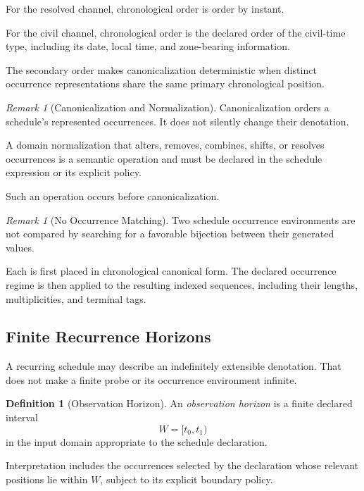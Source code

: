 \documentclass[11pt]{article}
\theoremstyle{plain}
\theoremstyle{definition}
\newtheorem{definition}[theorem]{Definition}
\theoremstyle{remark}
\newtheorem{remark}[theorem]{Remark}
\begin{document}
For the resolved channel,
chronological order is order by instant.

For the civil channel,
chronological order is the declared order
of the civil-time type,
including its date,
local time,
and zone-bearing information.

The secondary order makes canonicalization deterministic
when distinct occurrence representations
share the same primary chronological position.

\begin{remark}[Canonicalization and Normalization]
  \label{ik.rem.schedule-normalization}
  Canonicalization orders
  a schedule's represented occurrences.
  It does not silently change their denotation.

  A domain normalization that alters,
  removes,
  combines,
  shifts,
  or resolves occurrences
  is a semantic operation
  and must be declared in the schedule expression
  or its explicit policy.

  Such an operation occurs before canonicalization.
\end{remark}

\begin{remark}[No Occurrence Matching]
  \label{ik.rem.schedule-no-matching}
  Two schedule occurrence environments
  are not compared by searching
  for a favorable bijection
  between their generated values.

  Each is first placed in chronological canonical form.
  The declared occurrence regime
  is then applied to the resulting indexed sequences,
  including their lengths, multiplicities, and terminal tags.
\end{remark}

\subsection{Finite Recurrence Horizons}

A recurring schedule may describe
an indefinitely extensible denotation.
That does not make a finite probe
or its occurrence environment infinite.

\begin{definition}[Observation Horizon]
  \label{ik.def.schedule-horizon}
  An \emph{observation horizon}
  is a finite declared interval
  \[
    W
    =
    [t_0,t_1)
  \]
  in the input domain
  appropriate to the schedule declaration.

  Interpretation includes the occurrences selected by the declaration
  whose relevant positions lie within \(W\),
  subject to its explicit boundary policy.
\end{definition}
\end{document}
